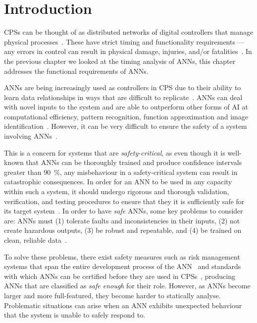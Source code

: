 \section{Introduction}
\label{sec:intro2}

\acp{CPS} can be thought of as distributed networks of digital controllers that manage physical processes~\cite{alur2015principles}. 
These have strict timing and functionality requirements --- any errors in control can result in physical damage, injuries, and/or fatalities~\cite{ANNDevModel1999}. 
In the previous chapter we looked at the timing analysis of \acp{ANN}, this chapter addresses the functional requirements of \acp{ANN}.

\acp{ANN} are being increasingly used as controllers in \ac{CPS} due to their ability to learn data relationships in ways that are difficult to replicate~\cite{ANNSafety2007}. 
\acp{ANN} can deal with novel inputs to the system and are able to outperform other forms of \ac{AI} at computational efficiency, pattern recognition, function approximation and image identification~\cite{AIComp2016, AIComp2017}. 
However, it can be very difficult to ensure the safety of a system involving \acp{ANN}~\cite{ANNSafety2007, ANNSafety2018}.

This is a concern for systems that are \textit{safety-critical}, as even though it is well-known that \acp{ANN} can be thoroughly trained and produce confidence intervals greater than 90~\%, any misbehaviour in a safety-critical system can result in  catastrophic consequences.
In order for an \ac{ANN} to be used in any capacity within such a system, it should undergo rigorous and thorough validation, verification, and testing procedures to ensure that they it is sufficiently safe for its target system~\cite{scann, ANNSafetyLifecycle2003}.
In order to have \textit{safe} \acp{ANN}, some key problems to consider are: \acp{ANN} must (1) tolerate faults and inconsistencies in their inputs, (2) not create hazardous outputs, (3) be robust and repeatable, and (4) be trained on clean, reliable data~\cite{EstSafeCriteria2003}.

To solve these problems, there exist safety measures such as risk management systems that span the entire development process of the \ac{ANN}~\cite{ANNDevModel1999} and standards with which \acp{ANN} can be certified before they are used in \acp{CPS}~\cite{SCANNStandard}, producing \acp{ANN} that are classified as \textit{safe enough} for their role. 
However, as \acp{ANN} become larger and more full-featured, they  become harder to statically analyse.
Problematic situations can arise when an \ac{ANN} exhibits unexpected behaviour that the system is unable to safely respond to.

